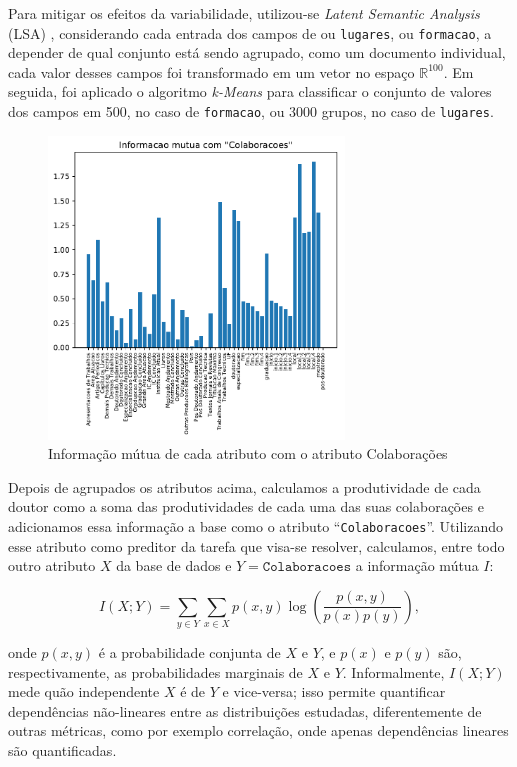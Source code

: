 \documentclass[12pt]{article}
\begin{document}
Para mitigar os efeitos da variabilidade, utilizou-se \emph{Latent Semantic Analysis} (LSA) \cite{lsa}, considerando cada entrada dos campos de ou \texttt{lugares}, ou \texttt{formacao}, a depender de qual conjunto está sendo agrupado, como um documento individual, cada valor desses campos foi transformado em um vetor no espaço $\mathbb{R}^{100}$.
Em seguida, foi aplicado o algoritmo \emph{k-Means} para classificar o conjunto de valores dos campos em 500, no caso de \texttt{formacao}, ou 3000 grupos, no caso de \texttt{lugares}.

\begin{figure}
  \centering
  \includegraphics[width=0.7\textwidth]{graphs/mutual_information.pdf}
  \caption{Informação mútua de cada atributo com o atributo Colaborações}
  \label{fig:mutual-info}
\end{figure}

Depois de agrupados os atributos acima, calculamos a produtividade de cada doutor como a soma das produtividades de cada uma das suas colaborações e adicionamos essa informação a base como o atributo ``\texttt{Colaboracoes}''.
Utilizando esse atributo como preditor da tarefa que visa-se resolver, calculamos, entre todo outro atributo $X$ da base de dados e $Y = \texttt{Colaboracoes}$ a informação mútua $I$:

\begin{equation}
  I(X; Y) = \sum_{y \in Y} \sum_{x \in X} p(x, y) \log \left( \frac{p(x, y)}{p(x)p(y)} \right),
\end{equation}

onde $p(x, y)$ é a probabilidade conjunta de $X$ e $Y$, e $p(x)$ e $p(y)$ são, respectivamente, as probabilidades marginais de $X$ e $Y$.
Informalmente, $I(X; Y)$ mede quão independente $X$ é de $Y$ e vice-versa; isso permite quantificar dependências não-lineares entre as distribuições estudadas, diferentemente de outras métricas, como por exemplo correlação, onde apenas dependências lineares são quantificadas.
\end{document}
